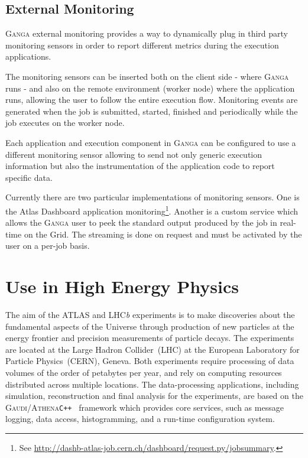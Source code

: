 \documentclass{elsart}
\def\lhcb {LHC{\em b\/}\xspace}
\def\atlas {ATLAS\xspace}
\def\lhc {LHC\xspace}
\def\ganga {\textsc{Ganga}\xspace}
\def\gaudi {\textsc{Gaudi}\xspace}
\def\athena {\textsc{Athena}\xspace}
\def\grid {Grid\xspace}
\newcommand{\code}[1]{\texttt{#1}}
\begin{document}
\subsection{External Monitoring}
\label{sec:ExternalMonitoring}
\ganga external monitoring provides a way to dynamically plug in third party
monitoring sensors in order to report different metrics during the execution
applications. 

The monitoring sensors can be inserted both on the client side - where \ganga
runs - and also on the remote environment (worker node) where the application
runs, allowing the user to follow the entire execution flow.  Monitoring
events are generated when the job is submitted, started, finished and
periodically while the job executes on the worker node.

Each application and execution component in \ganga can be configured to use a
different monitoring sensor allowing to send not only generic execution
information but also the instrumentation of the application code to report
specific data.

Currently there are two particular implementations of monitoring sensors. One
is the Atlas Dashboard application monitoring\footnote{See
  \url{http://dashb-atlas-job.cern.ch/dashboard/request.py/jobsummary}.}.
Another is a custom service which allows the \ganga user to peek the standard
output produced by the job in real-time on the \grid. The streaming is done on
request and must be activated by the user on a per-job basis.

\section{Use in High Energy Physics}
\label{sec:useHEP}

The aim of the \atlas and \lhcb experiments is to make discoveries about the
fundamental aspects of the Universe through production of new particles at the
energy frontier and precision measurements of particle decays. The experiments
are located at the Large Hadron Collider~(\lhc) at the European Laboratory for
Particle Physics~(CERN), Geneva. Both experiments require processing of data
volumes of the order of petabytes per year, and rely on computing resources
distributed across multiple locations. The data-processing applications,
including simulation, reconstruction and final analysis for the experiments,
are based on the \gaudi/\athena \code{C++}~\cite{gaudi} framework which
provides core services, such as message logging, data access, histogramming,
and a run-time configuration system. 
\end{document}
